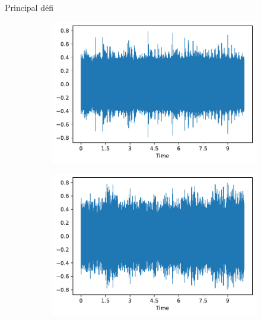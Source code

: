 \documentclass[compress,xcolor=table]{beamer}
\begin{document}
\begin{frame}{Principal défi}

    \begin{figure}[ht]
        \centering
        \begin{subfigure}[b]{0.45\textwidth}
            \centering
            \includegraphics[width=\textwidth]{../images/audio/birds.wave.birdvox.pdf}
            \label{fig:birds.wave.birdvox}
        \end{subfigure}
        \hfill
        \begin{subfigure}[b]{0.45\textwidth}
            \centering
            \includegraphics[width=\textwidth]{../images/audio/nobirds.wave.birdvox.pdf}
            \label{fig:nobirds.wave.birdvox}
        \end{subfigure}

        \vspace{-0.7cm}


\end{figure}
\end{frame}
\end{document}
